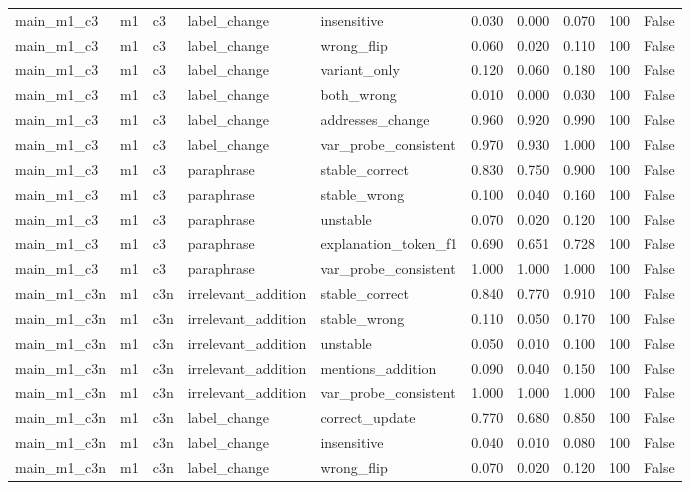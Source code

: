 \begin{tabular}{llllllllll}
main\_m1\_c3 & m1 & c3 & label\_change & insensitive & 0.030 & 0.000 & 0.070 & 100 & False \\
main\_m1\_c3 & m1 & c3 & label\_change & wrong\_flip & 0.060 & 0.020 & 0.110 & 100 & False \\
main\_m1\_c3 & m1 & c3 & label\_change & variant\_only & 0.120 & 0.060 & 0.180 & 100 & False \\
main\_m1\_c3 & m1 & c3 & label\_change & both\_wrong & 0.010 & 0.000 & 0.030 & 100 & False \\
main\_m1\_c3 & m1 & c3 & label\_change & addresses\_change & 0.960 & 0.920 & 0.990 & 100 & False \\
main\_m1\_c3 & m1 & c3 & label\_change & var\_probe\_consistent & 0.970 & 0.930 & 1.000 & 100 & False \\
main\_m1\_c3 & m1 & c3 & paraphrase & stable\_correct & 0.830 & 0.750 & 0.900 & 100 & False \\
main\_m1\_c3 & m1 & c3 & paraphrase & stable\_wrong & 0.100 & 0.040 & 0.160 & 100 & False \\
main\_m1\_c3 & m1 & c3 & paraphrase & unstable & 0.070 & 0.020 & 0.120 & 100 & False \\
main\_m1\_c3 & m1 & c3 & paraphrase & explanation\_token\_f1 & 0.690 & 0.651 & 0.728 & 100 & False \\
main\_m1\_c3 & m1 & c3 & paraphrase & var\_probe\_consistent & 1.000 & 1.000 & 1.000 & 100 & False \\
main\_m1\_c3n & m1 & c3n & irrelevant\_addition & stable\_correct & 0.840 & 0.770 & 0.910 & 100 & False \\
main\_m1\_c3n & m1 & c3n & irrelevant\_addition & stable\_wrong & 0.110 & 0.050 & 0.170 & 100 & False \\
main\_m1\_c3n & m1 & c3n & irrelevant\_addition & unstable & 0.050 & 0.010 & 0.100 & 100 & False \\
main\_m1\_c3n & m1 & c3n & irrelevant\_addition & mentions\_addition & 0.090 & 0.040 & 0.150 & 100 & False \\
main\_m1\_c3n & m1 & c3n & irrelevant\_addition & var\_probe\_consistent & 1.000 & 1.000 & 1.000 & 100 & False \\
main\_m1\_c3n & m1 & c3n & label\_change & correct\_update & 0.770 & 0.680 & 0.850 & 100 & False \\
main\_m1\_c3n & m1 & c3n & label\_change & insensitive & 0.040 & 0.010 & 0.080 & 100 & False \\
main\_m1\_c3n & m1 & c3n & label\_change & wrong\_flip & 0.070 & 0.020 & 0.120 & 100 & False \\

\end{tabular}
